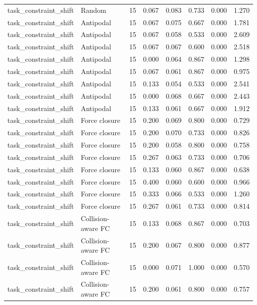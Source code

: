 {\begin{longtable}{llrrrrrr}
task\_constraint\_shift & Random & 15 & 0.067 & 0.083 & 0.733 & 0.000 & 1.270 \\
task\_constraint\_shift & Antipodal & 15 & 0.067 & 0.075 & 0.667 & 0.000 & 1.781 \\
task\_constraint\_shift & Antipodal & 15 & 0.067 & 0.058 & 0.533 & 0.000 & 2.609 \\
task\_constraint\_shift & Antipodal & 15 & 0.067 & 0.067 & 0.600 & 0.000 & 2.518 \\
task\_constraint\_shift & Antipodal & 15 & 0.000 & 0.064 & 0.867 & 0.000 & 1.298 \\
task\_constraint\_shift & Antipodal & 15 & 0.067 & 0.061 & 0.867 & 0.000 & 0.975 \\
task\_constraint\_shift & Antipodal & 15 & 0.133 & 0.054 & 0.533 & 0.000 & 2.541 \\
task\_constraint\_shift & Antipodal & 15 & 0.000 & 0.068 & 0.667 & 0.000 & 2.443 \\
task\_constraint\_shift & Antipodal & 15 & 0.133 & 0.061 & 0.667 & 0.000 & 1.912 \\
task\_constraint\_shift & Force closure & 15 & 0.200 & 0.069 & 0.800 & 0.000 & 0.729 \\
task\_constraint\_shift & Force closure & 15 & 0.200 & 0.070 & 0.733 & 0.000 & 0.826 \\
task\_constraint\_shift & Force closure & 15 & 0.200 & 0.058 & 0.800 & 0.000 & 0.758 \\
task\_constraint\_shift & Force closure & 15 & 0.267 & 0.063 & 0.733 & 0.000 & 0.706 \\
task\_constraint\_shift & Force closure & 15 & 0.133 & 0.060 & 0.867 & 0.000 & 0.638 \\
task\_constraint\_shift & Force closure & 15 & 0.400 & 0.060 & 0.600 & 0.000 & 0.966 \\
task\_constraint\_shift & Force closure & 15 & 0.333 & 0.066 & 0.533 & 0.000 & 1.260 \\
task\_constraint\_shift & Force closure & 15 & 0.267 & 0.061 & 0.733 & 0.000 & 0.814 \\
task\_constraint\_shift & Collision-aware FC & 15 & 0.133 & 0.068 & 0.867 & 0.000 & 0.703 \\
task\_constraint\_shift & Collision-aware FC & 15 & 0.200 & 0.067 & 0.800 & 0.000 & 0.877 \\
task\_constraint\_shift & Collision-aware FC & 15 & 0.000 & 0.071 & 1.000 & 0.000 & 0.570 \\
task\_constraint\_shift & Collision-aware FC & 15 & 0.200 & 0.061 & 0.800 & 0.000 & 0.757 \\

\end{longtable}}
